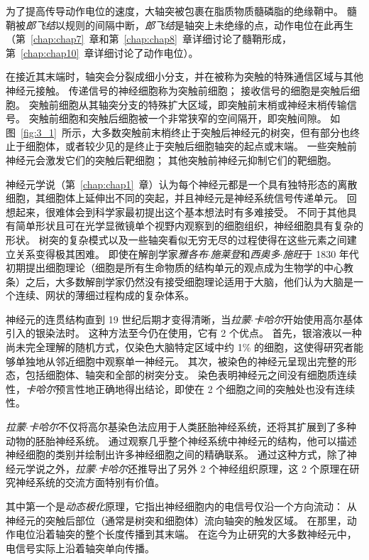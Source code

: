 为了提高传导动作电位的速度，大轴突被包裹在脂质物质髓磷脂的绝缘鞘中。
髓鞘被\textit{郎飞结}以规则的间隔中断，\textit{郎飞结}是轴突上未绝缘的点，动作电位在此再生（第~\ref{chap:chap7}~章和第~\ref{chap:chap8}~章详细讨论了髓鞘形成，第~\ref{chap:chap10}~章详细讨论了动作电位）。


在接近其末端时，轴突会分裂成细小分支，并在被称为突触的特殊通信区域与其他神经元接触。
传递信号的神经细胞称为突触前细胞；
接收信号的细胞是突触后细胞。
突触前细胞从其轴突分支的特殊扩大区域，即突触前末梢或神经末梢传输信号。
突触前细胞和突触后细胞被一个非常狭窄的空间隔开，即突触间隙。
如图~\ref{fig:3_1}~所示，大多数突触前末梢终止于突触后神经元的树突，但有部分也终止于细胞体，或者较少见的是终止于突触后细胞轴突的起点或末端。
一些突触前神经元会激发它们的突触后靶细胞；
其他突触前神经元抑制它们的靶细胞。


神经元学说（第~\ref{chap:chap1}~章）认为每个神经元都是一个具有独特形态的离散细胞，其细胞体上延伸出不同的突起，并且神经元是神经系统信号传递单元。
回想起来，很难体会到科学家最初提出这个基本想法时有多难接受。
不同于其他具有简单形状且可在光学显微镜单个视野内观察到的细胞组织，神经细胞具有复杂的形状。
树突的复杂模式以及一些轴突看似无穷无尽的过程使得在这些元素之间建立关系变得极其困难。
即使在解剖学家\textit{雅各布$\cdot$施莱登}和\textit{西奥多$\cdot$施旺}于 1830 年代初期提出细胞理论（细胞是所有生命物质的结构单元的观点成为生物学的中心教条）之后，大多数解剖学家仍然没有接受细胞理论适用于大脑，他们认为大脑是一个连续、网状的薄细过程构成的复杂体系。


神经元的连贯结构直到 19 世纪后期才变得清晰，当\textit{拉蒙$\cdot$卡哈尔}开始使用高尔基体引入的银染法时。
这种方法至今仍在使用，它有 2 个优点。
首先，银溶液以一种尚未完全理解的随机方式，仅染色大脑特定区域中约 1\% 的细胞，这使得研究者能够单独地从邻近细胞中观察单一神经元。
其次，被染色的神经元呈现出完整的形态，包括细胞体、轴突和全部的树突分支。
染色表明神经元之间没有细胞质连续性，\textit{卡哈尔}预言性地正确地得出结论，即使在 2 个细胞之间的突触处也没有连续性。


\textit{拉蒙$\cdot$卡哈尔}不仅将高尔基染色法应用于人类胚胎神经系统，还将其扩展到了多种动物的胚胎神经系统。 
通过观察几乎整个神经系统中神经元的结构，他可以描述神经细胞的类别并绘制出许多神经细胞之间的精确联系。
通过这种方式，除了神经元学说之外，\textit{拉蒙$\cdot$卡哈尔}还推导出了另外 2 个神经组织原理，这 2 个原理在研究神经系统的交流方面特别有价值。


其中第一个是\textit{动态极化}原理，它指出神经细胞内的电信号仅沿一个方向流动：
从神经元的突触后部位（通常是树突和细胞体）流向轴突的触发区域。
在那里，动作电位沿着轴突的整个长度传播到其末端。
在迄今为止研究的大多数神经元中，电信号实际上沿着轴突单向传播。


